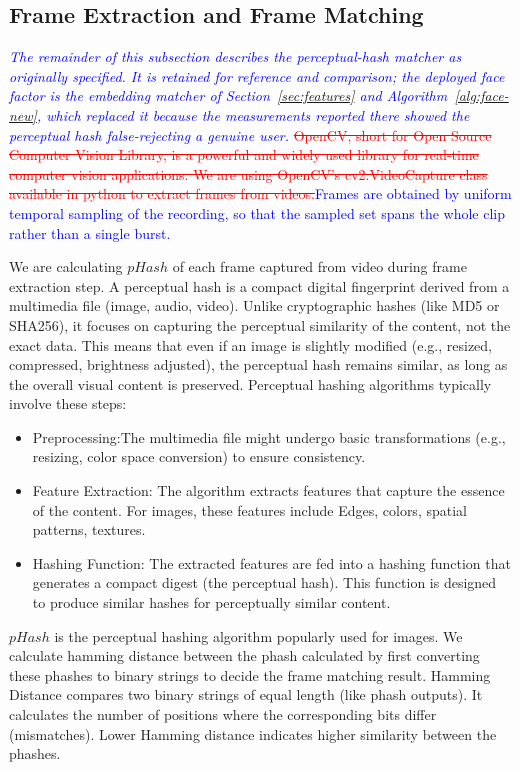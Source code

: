 \documentclass[10pt,journal,compsoc]{IEEEtran}
\begin{document}
\subsection{Frame Extraction and Frame Matching}
\textcolor{blue}{\emph{The remainder of this subsection describes the perceptual-hash matcher as originally specified. It is retained for reference and comparison; the deployed face factor is the embedding matcher of Section~\ref{sec:features} and Algorithm~\ref{alg:face-new}, which replaced it because the measurements reported there showed the perceptual hash false-rejecting a genuine user.}}
\textcolor{red}{\sout{OpenCV, short for Open Source Computer Vision Library, is a powerful and widely used library for real-time computer vision applications. We are using OpenCV's cv2.VideoCapture class available in python to extract frames from videos.}}\textcolor{blue}{Frames are obtained by uniform temporal sampling of the recording, so that the sampled set spans the whole clip rather than a single burst.}
\par { We are calculating $pHash$ of each frame captured from video during frame extraction step. A perceptual hash is a compact digital fingerprint derived from a multimedia file (image, audio, video). Unlike cryptographic hashes (like MD5 or SHA256), it focuses on capturing the perceptual similarity of the content, not the exact data. This means that even if an image is slightly modified (e.g., resized, compressed, brightness adjusted), the perceptual hash remains similar, as long as the overall visual content is preserved. Perceptual hashing algorithms typically involve these steps:
\begin{itemize}
    \item Preprocessing:The multimedia file might undergo basic transformations (e.g., resizing, color space conversion) to ensure consistency.
    \item Feature Extraction: The algorithm extracts features that capture the essence of the content. For images, these features include Edges, colors, spatial patterns, textures.
    \item Hashing Function: The extracted features are fed into a hashing function that generates a compact digest (the perceptual hash). This function is designed to produce similar hashes for perceptually similar content. 
\end{itemize}
$pHash$ is the perceptual hashing algorithm popularly used for images.
We calculate hamming distance between the phash calculated by first converting these phashes to binary strings to decide the frame matching result. Hamming Distance compares two binary strings of equal length (like phash outputs).
It calculates the number of positions where the corresponding bits differ (mismatches). Lower Hamming distance indicates higher similarity between the phashes. 
}
\end{document}
